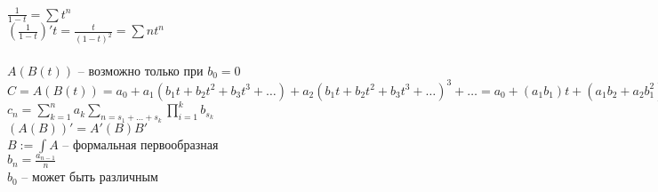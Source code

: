 \documentclass[12pt]{article}
\begin{document}
$\frac{1}{1-t} = \sum t^n$\\
$(\frac1{1-t})'t = \frac{t}{(1-t)^2} = \sum nt^n$\\\\
$A(B(t))$ -- возможно только при $b_0 = 0$\\
$C = A(B(t)) = a_0 + a_1(b_1t + b_2t^2 + b_3t^3+\ldots) + a_2(b_1t + b_2t^2 + b_3t^3+\ldots)^3 + \ldots = a_0 + (a_1b_1)t + (a_1b_2 + a_2b_1^2)t^2 + (a_1b_3 + a_2b_1b_2 + a_2b_2b_1 + a_3b_1^3)t^3+\ldots$\\
$c_n = \sum_{k=1}^n a_k\sum_{n=s_1+\ldots+s_k} \prod_{i=1}^{k}b_{s_k}$\\
$(A(B))' = A'(B)B'$\\
$B:=\int A$ -- формальная первообразная\\
$b_n = \frac{a_{n-1}}{n}$\\
$b_0$ -- может быть различным\\
\end{document}
